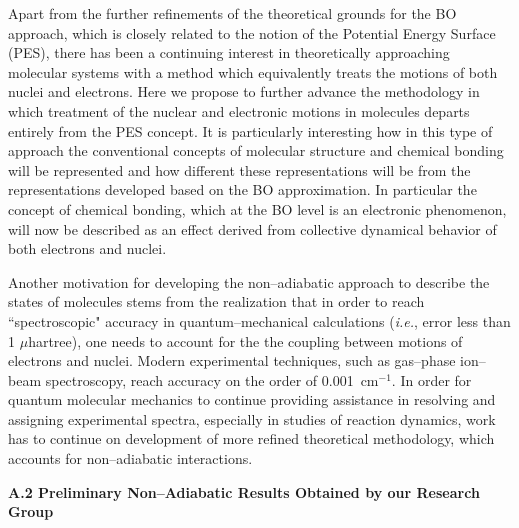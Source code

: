 Apart from the further refinements of the theoretical grounds
for the BO approach, which is closely related to the notion
of the Potential Energy Surface (PES), there has been a continuing
interest in theoretically approaching molecular systems 
with a method which equivalently treats
the motions of both nuclei and electrons.
Here we propose to further advance the methodology 
in which treatment of the nuclear and electronic motions
in molecules departs entirely from the PES concept. 
It is particularly
interesting how in this type of approach the conventional concepts
of molecular structure and chemical bonding will be represented
and how different these representations will be 
from the representations
developed based on the BO approximation. In particular the concept
of chemical bonding, which at the BO level is an electronic 
phenomenon, will now be described as an effect derived from
collective dynamical behavior of both electrons and nuclei.

Another motivation for developing the non--adiabatic approach to 
describe the states of molecules stems from the realization that
in order to reach ``spectroscopic" accuracy in quantum--mechanical
calculations ({\it i.e.}, error less than 1 $\mu$hartree), one needs
to account for the the coupling between
motions of electrons and nuclei. Modern experimental techniques,
such as gas--phase ion--beam spectroscopy, reach accuracy on the
order of 0.001~cm$^{-1}$.\cite{C} In order for quantum molecular mechanics
to continue providing assistance in resolving and assigning
experimental spectra, especially in studies of reaction dynamics,
work has to continue on development of more refined theoretical 
methodology, which accounts for non--adiabatic interactions.

\vspace{3mm}
\noindent
{\bf A.2 Preliminary Non--Adiabatic Results 
Obtained by our Research Group}
\vspace{2mm}

